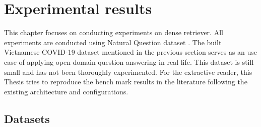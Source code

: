 \documentclass[12pt, sort&compress]{report}
\begin{document}
\chapter{Experimental results}
\label{chap:04}
This chapter focuses on conducting experiments on dense retriever. All experiments are conducted using Natural Question dataset \cite{kwiatkowski2019natural}. The built Vietnamese COVID-19 dataset mentioned in the previous section serves as an use case of applying open-domain question answering in real life. This dataset is still small and has not been thoroughly experimented. For the extractive reader, this Thesis tries to reproduce the bench mark results in the literature following the existing architecture and configurations. 
\section{Datasets}
\end{document}
